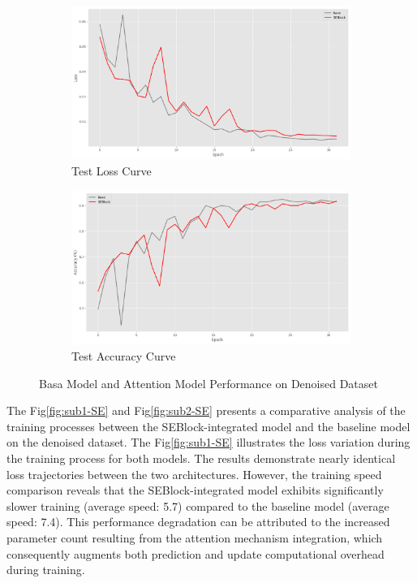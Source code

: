 \documentclass[conference]{IEEEtran}
\begin{document}
\begin{figure}[htbp]
    \begin{subfigure}[b]{0.24\textwidth}
        \centering
        \includegraphics[width=\textwidth]{figure/SE_test_loss.png}
        \caption{Test Loss Curve}
        \label{fig:sub3-SE}
    \end{subfigure}
    \begin{subfigure}[b]{0.24\textwidth}
        \centering
        \includegraphics[width=\textwidth]{figure/SE_test_acc.png}
        \caption{Test Accuracy Curve}
        \label{fig:sub4-SE}
    \end{subfigure}
    \caption{Basa Model and Attention Model Performance on Denoised Dataset}
    \label{fig:SE}
\end{figure}

The Fig\ref{fig:sub1-SE} and Fig\ref{fig:sub2-SE} presents a comparative analysis of the training processes between the SEBlock-integrated model and the baseline model on the denoised dataset. The Fig\ref{fig:sub1-SE} illustrates the loss variation during the training process for both models. The results demonstrate nearly identical loss trajectories between the two architectures. However, the training speed comparison reveals that the SEBlock-integrated model exhibits significantly slower training (average speed: 5.7) compared to the baseline model (average speed: 7.4). This performance degradation can be attributed to the increased parameter count resulting from the attention mechanism integration, which consequently augments both prediction and update computational overhead during training.
\end{document}
